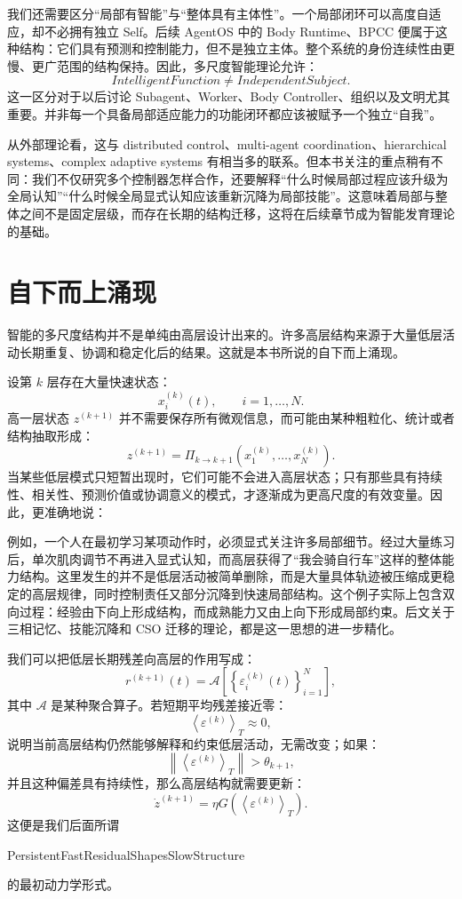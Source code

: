 我们还需要区分“局部有智能”与“整体具有主体性”。一个局部闭环可以高度自适应，却不必拥有独立 Self。后续 AgentOS 中的 Body Runtime、BPCC 便属于这种结构：它们具有预测和控制能力，但不是独立主体。整个系统的身份连续性由更慢、更广范围的结构保持。因此，多尺度智能理论允许：
\[
IntelligentFunction
\neq
IndependentSubject.
\]
这一区分对于以后讨论 Subagent、Worker、Body Controller、组织以及文明尤其重要。并非每一个具备局部适应能力的功能闭环都应该被赋予一个独立“自我”。

从外部理论看，这与 distributed control、multi-agent coordination、hierarchical systems、complex adaptive systems 有相当多的联系。但本书关注的重点稍有不同：我们不仅研究多个控制器怎样合作，还要解释“什么时候局部过程应该升级为全局认知”“什么时候全局显式认知应该重新沉降为局部技能”。这意味着局部与整体之间不是固定层级，而存在长期的结构迁移，这将在后续章节成为智能发育理论的基础。

\section{自下而上涌现}

智能的多尺度结构并不是单纯由高层设计出来的。许多高层结构来源于大量低层活动长期重复、协调和稳定化后的结果。这就是本书所说的自下而上涌现。

设第 $k$ 层存在大量快速状态：
\[
x_i^{(k)}(t),
\qquad i=1,\ldots,N.
\]
高一层状态 $z^{(k+1)}$ 并不需要保存所有微观信息，而可能由某种粗粒化、统计或者结构抽取形成：
\[
z^{(k+1)}
=
\Pi_{k\rightarrow k+1}
\left(
x_1^{(k)},
\ldots,
x_N^{(k)}
\right).
\]
当某些低层模式只短暂出现时，它们可能不会进入高层状态；只有那些具有持续性、相关性、预测价值或协调意义的模式，才逐渐成为更高尺度的有效变量。因此，更准确地说：
\begin{statementbox}
\centering
{}
\end{statementbox}

例如，一个人在最初学习某项动作时，必须显式关注许多局部细节。经过大量练习后，单次肌肉调节不再进入显式认知，而高层获得了“我会骑自行车”这样的整体能力结构。这里发生的并不是低层活动被简单删除，而是大量具体轨迹被压缩成更稳定的高层规律，同时控制责任又部分沉降到快速局部结构。这个例子实际上包含双向过程：经验由下向上形成结构，而成熟能力又由上向下形成局部约束。后文关于三相记忆、技能沉降和 CSO 迁移的理论，都是这一思想的进一步精化。

我们可以把低层长期残差向高层的作用写成：
\[
r^{(k+1)}(t)
=
\mathcal{A}
\left[
\left\{
\varepsilon_i^{(k)}(t)
\right\}_{i=1}^{N}
\right],
\]
其中 $\mathcal{A}$ 是某种聚合算子。若短期平均残差接近零：
\[
\left\langle
\varepsilon^{(k)}
\right\rangle_T
\approx0,
\]
说明当前高层结构仍然能够解释和约束低层活动，无需改变；如果：
\[
\left\|
\left\langle
\varepsilon^{(k)}
\right\rangle_T
\right\|
>
\theta_{k+1},
\]
并且这种偏差具有持续性，那么高层结构就需要更新：
\[
\dot z^{(k+1)}
=
\eta
G
\left(
\left\langle
\varepsilon^{(k)}
\right\rangle_T
\right).
\]
这便是我们后面所谓
\begin{statementbox}
PersistentFastResidualShapesSlowStructure
\end{statementbox}
的最初动力学形式。

